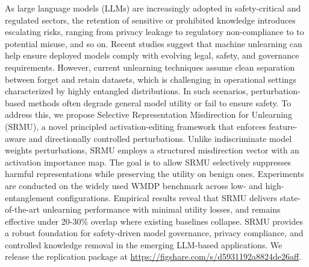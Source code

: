 
As large language models (LLMs) are increasingly adopted in safety-critical and regulated sectors, the retention of sensitive or prohibited knowledge introduces escalating risks, ranging from privacy leakage to regulatory non-compliance to to potential misuse, and so on. Recent studies suggest that machine unlearning can help ensure deployed models comply with evolving legal, safety, and governance requirements. However, current unlearning techniques assume clean separation between forget and retain datasets, which is challenging in operational settings characterized by highly entangled distributions. In such scenarios, perturbation-based methods often degrade general model utility or fail to ensure safety. To address this, we propose Selective Representation Misdirection for Unlearning (SRMU), a novel principled activation-editing framework that enforces feature-aware and directionally controlled perturbations. Unlike indiscriminate model weights perturbations, SRMU employs a structured misdirection vector with an activation importance map. The goal is to allow SRMU selectively suppresses harmful representations while preserving the utility on benign ones. Experiments are conducted on the widely used WMDP benchmark across low- and high-entanglement configurations. Empirical results reveal that SRMU delivers state-of-the-art unlearning performance with minimal utility losses, and remains effective under 20-30\% overlap where existing baselines collapse. SRMU provides a robust foundation for safety-driven model governance, privacy compliance, and controlled knowledge removal in the emerging LLM-based applications. We release the replication package at \url{https://figshare.com/s/d5931192a8824de26aff}.





